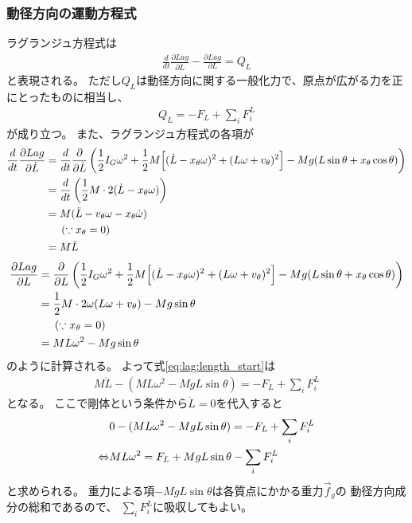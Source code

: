 \documentclass[a4paper,11pt]{jsarticle}
\begin{document}
\subsubsection*{動径方向の運動方程式}
ラグランジュ方程式は
\begin{align}
  \frac{d}{dt}\frac{\partial Lag}{\partial \dot{L}} - \frac{\partial Lag}{\partial L} = Q_L
  \label{eq:lag:length_start}
\end{align}
と表現される。
ただし$Q_L$は動径方向に関する一般化力で、原点が広がる力を正にとったものに相当し、
\begin{align*}
  Q_L = -F_L +  \sum_i F_i^L
\end{align*}
が成り立つ。
また、ラグランジュ方程式の各項が
\begin{align*}
  \frac{d}{dt}\frac{\partial Lag}{\partial \dot{L}}
  &= \frac{d}{dt}\frac{\partial }{\partial \dot{L}}
  \left(
    \frac{1}{2}I_G\omega^2
    + \frac{1}{2}M
    \Bigl[ (\dot{L} - x_\theta \omega)^2 + (L\omega + v_\theta)^2 \Bigr]
    - Mg ( L\sin\theta + x_\theta \cos\theta )
  \right)
  \\
  & = \frac{d}{dt}\left( \frac{1}{2}M \cdot 2(\dot{L} - x_\theta \omega)\right)
  \\
  &= M( \ddot{L} - v_\theta \omega - x_\theta \dot\omega )
  \\
  & \ \ \ \ \left( \because x_\theta = 0 \right)
  \\
  &= M \ddot{L}
\end{align*}
\begin{align*}
  \frac{\partial Lag}{\partial L}
  &= \frac{\partial }{\partial L}
  \left(
    \frac{1}{2}I_G\omega^2
    + \frac{1}{2}M
    \Bigl[ (\dot{L} - x_\theta \omega)^2 + (L\omega + v_\theta)^2 \Bigr]
    - Mg ( L\sin\theta + x_\theta \cos\theta )
  \right)
  \\
  &= \frac{1}{2}M \cdot 2\omega(L\omega + v_\theta) - Mg\sin\theta
  \\
  & \ \ \ \ \left( \because x_\theta = 0 \right)
  \\
  &= ML\omega^2 - Mg\sin\theta
\end{align*}
のように計算される。
よって式\ref{eq:lag:length_start}は
\begin{align*}
  M\ddot{L} - ( ML\omega^2 - MgL\sin\theta ) = -F_L + \sum_i F_i^L
\end{align*}
となる。
ここで剛体という条件から$\ddot{L} = 0$を代入すると
\begin{align}
  & 0 - ( ML\omega^2 - MgL\sin\theta ) = -F_L + \sum_i F_i^L
  \notag
  \\
  \Leftrightarrow
  & ML\omega^2 = F_L + MgL\sin\theta - \sum_i F_i^L
  \label{eq:lag:length_end}
\end{align}
と求められる。
重力による項$-MgL\sin\theta$は各質点にかかる重力$\vec{f}_g$の
動径方向成分の総和であるので、
$\sum_i F_i^L$に吸収してもよい。
\end{document}
